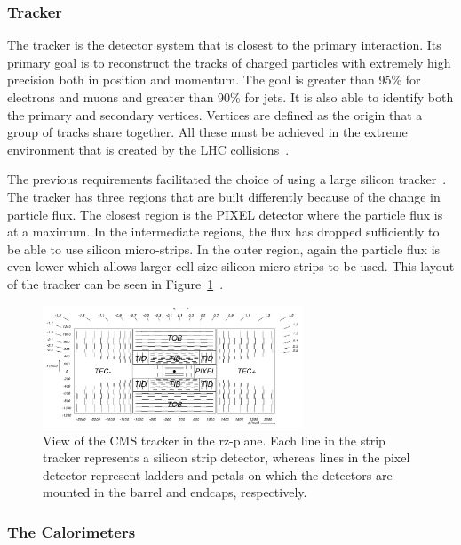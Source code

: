 \subsubsection{Tracker}
The tracker is the detector system that is closest to the primary interaction.  Its primary goal is to reconstruct the tracks of charged particles with extremely high precision both in position and momentum. The goal is greater than 95\% for electrons and muons and greater than 90\% for jets. It is also able to identify both the primary and secondary vertices.  Vertices are defined as the origin that a group of tracks share together. All these must be achieved in the extreme environment that is created by the LHC collisions~\cite{cms_trakcer_project}.

The previous requirements facilitated the choice of using a large silicon tracker~\cite{cms_trakcer_project}.  The tracker has three regions that are built differently because of the change in particle flux.  The closest region is the PIXEL detector where the particle flux is at a maximum.
In the intermediate regions, the flux has dropped sufficiently to be able to use silicon micro-strips.  In the outer region, again the particle flux is even lower which allows larger cell size silicon micro-strips to be used.  This layout of the tracker can be seen in Figure~\ref{fig:CMS_tacker}~\cite{2010JInst...5.6007S}.

\begin{figure}[htb]
\centering
\includegraphics[width=0.69\textwidth]{Experiment/fig_cmstracker.png}
\caption{View of the CMS tracker in the rz-plane. Each line in the strip tracker represents a silicon strip detector, whereas lines in the pixel detector represent ladders and petals on which the detectors are mounted in the barrel and endcaps, respectively.~\cite{2010JInst...5.6007S}}
\label{fig:CMS_tacker}
\end{figure}

\subsubsection{The Calorimeters}

